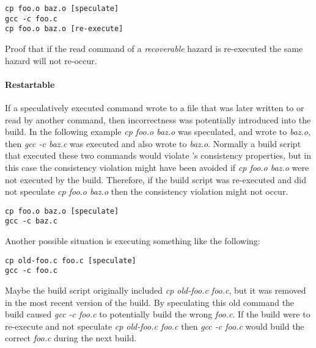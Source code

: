 \begin{verbatim}
cp foo.o baz.o [speculate]
gcc -c foo.c
cp foo.o baz.o [re-execute]
\end{verbatim}

Proof that if the read command of a \emph{recoverable} hazard is re-executed the same hazard will not re-occur.


\paragraph{Restartable} %
If a speculatively executed command wrote to a file that was later written to or read by another command, then incorrectness was potentially introduced into the build.  In the following example \emph{cp foo.o baz.o} was speculated, and wrote to \emph{baz.o}, then \emph{gcc -c baz.c} was executed and also wrote to \emph{baz.o}.  Normally a build script that executed these two commands would violate \Rattle's consistency properties, but in this case the consistency violation might have been avoided if \emph{cp foo.o baz.o} were not executed by the build.  Therefore, if the build script was re-executed and did not speculate \emph{cp foo.o baz.o} then the consistency violation might not occur.

\begin{verbatim}
cp foo.o baz.o [speculate]
gcc -c baz.c
\end{verbatim}

Another possible situation is \Rattle executing something like the following:

\begin{verbatim}
cp old-foo.c foo.c [speculate]
gcc -c foo.c
\end{verbatim}

Maybe the build script originally included \emph{cp old-foo.c foo.c}, but it was removed in the most recent version of the build.  By speculating this old command the build caused \emph{gcc -c foo.c} to
potentially build the wrong \emph{foo.c}.  If the build  were to re-execute and not speculate \emph{cp old-foo.c foo.c} then \emph{gcc -c foo.c} would build the correct \emph{foo.c} during the next build.  %

